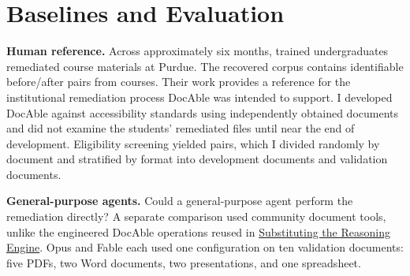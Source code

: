 
\section{Baselines and Evaluation}\label{heading:human-remediation-as-a-reference}


\textbf{Human reference.} Across approximately six months,  trained undergraduates remediated course materials at Purdue. The recovered corpus contains  identifiable before/after pairs from  courses. Their work provides a reference for the institutional remediation process DocAble was intended to support. I developed DocAble against accessibility standards using independently obtained documents and did not examine the students' remediated files until near the end of development. Eligibility screening yielded  pairs, which I divided randomly by document and stratified by format into  development documents and  validation documents.


\textbf{General-purpose agents.} Could a general-purpose agent perform the remediation directly? A separate comparison used community document tools, unlike the engineered DocAble operations reused in \hyperref[5.2-inside-docables-software-factory:heading:exploring-alternative-reasoning-engines]{Substituting the Reasoning Engine}. Opus and Fable each used one configuration on ten validation documents: five PDFs, two Word documents, two presentations, and one spreadsheet.

